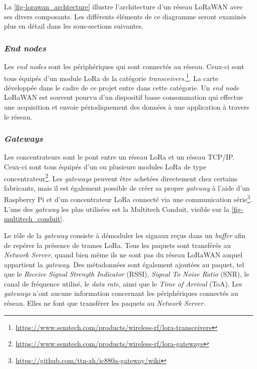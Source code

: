 La \cref{fig-lorawan_archtecture} illustre l'architecture d'un réseau LoRaWAN avec ses divers composants. Les différents éléments de ce diagramme seront examinés plus en détail dans les sous-sections suivantes.


\subsubsection{\textit{End nodes}}
Les \textit{end nodes} sont les périphériques qui sont connectés au réseau. Ceux-ci sont tous équipés d'un module LoRa de la catégorie \textit{transceivers.}\footnote{\url{https://www.semtech.com/products/wireless-rf/lora-transceivers}}. La carte développée dans le cadre de ce projet entre dans cette catégorie. Un \textit{end node} LoRaWAN est souvent pourvu d'un dispositif basse consommation qui effectue une acquisition et envoie périodiquement des données à une application à travers le réseau. 



\subsubsection{\textit{Gateways}}

Les concentrateurs sont le pont entre un réseau LoRa et un réseau TCP/IP. Ceux-ci sont tous équipés d'un ou plusieurs modules LoRa de type concentrateur\footnote{\url{https://www.semtech.com/products/wireless-rf/lora-gateways}}. Les \textit{gateways} peuvent être achetées directement chez certains fabricants, mais il est également possible de créer sa propre \textit{gateway} à l'aide d'un Raspberry Pi et d'un concentrateur LoRa connecté via une communication série\footnote{\url{https://github.com/ttn-zh/ic880a-gateway/wiki}}. L'une des \textit{gateway} les plus utilisées est la Multitech Conduit, visible sur la \cref{fig-multitech_conduit}.

Le rôle de la \textit{gateway} consiste à démoduler les signaux reçus dans un \textit{buffer} afin de repérer la présence de trames LoRa. Tous les paquets sont transférés au \textit{Network Server}, quand bien même ils ne sont pas du réseau LoRaWAN auquel appartient la \textit{gateway}. Des métadonnées sont également ajoutées au paquet, tel que le \textit{Receive Signal Strength Indicator} (RSSI), \textit{Signal To Noise Ratio} (SNR), le canal de fréquence utilisé, le \textit{data rate}, ainsi que le \textit{Time of Arrival} (ToA). Les \textit{gateways} n'ont aucune information concernant les périphériques connectés au réseau. Elles ne font que transférer les paquets au \textit{Network Server}.

